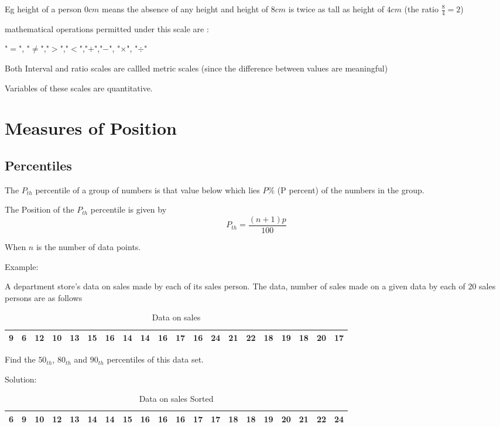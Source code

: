 \documentclass[12pt]{article}
\begin{document}
Eg height of a person $0cm$ means the absence of any height and height of $8cm$ is twice as tall as height of $4cm$ (the ratio $\frac{8}{4} = 2$)

mathematical operations permitted under this scale are :

"$=$", "$\neq$","$>$","$<$","$+$","$-$", "$\times$", "$\div$"

Both Interval and ratio scales are callled metric scales (since the difference between values are meaningful)

Variables of these scales are quantitative.
\newpage

\section{Measures of Position}

\subsection{Percentiles}
The $P_{th}$ percentile of a group of numbers is that value below which lies $P\%$ (P percent) of the numbers in the group.

The Position of the $P_{th}$ percentile is given by
\begin{equation}
    P_{th} = \frac{(n+1)p}{100}
\end{equation}

When $n$ is the number of data points.

Example:

A department store's data on sales made by each  of its sales person. The data, number of sales made on a given data by each of $20$ sales persons are as follows
\begin{table}[H]
    \centering
    \caption{Data on sales}
    \begin{tabular}{|*{20}{c|}}

        \hline
        9  & 6  & 12 & 10 & 13 & 15 & 16 & 14 & 14 & 16 &
        17 & 16 & 24 & 21 & 22 & 18 & 19 & 18 & 20 & 17   \\
        \hline
    \end{tabular}
\end{table}


Find the $50_{th}$, $80_{th}$ and $90_{th}$ percentiles of this data set.

Solution:
\begin{table}[H]
    \centering
    \caption{Data on sales Sorted}
    \begin{tabular}{|*{20}{c|}}

        \hline
        6 & 9 & 10 & 12 & 13 & 14 & 14 & 15 & 16 & 16 & 16 & 17 & 17 & 18 & 18 & 19 & 20 & 21 & 22 & 24 \\
        \hline
    \end{tabular}
\end{table}
\end{document}
